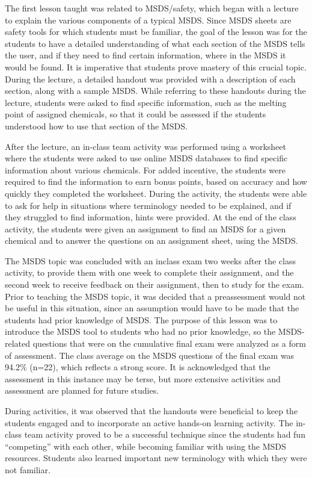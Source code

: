 \documentclass[11.5pt]{sig-alternate} %
\begin{document}
\begin{large}
The first lesson taught was related to MSDS/safety, which began with a lecture to explain the various components of a typical MSDS. Since MSDS sheets are safety tools for which students must be familiar, the goal of the lesson was for the students to have a detailed understanding of what each section of the MSDS tells the user, and if they need to find certain information, where in the MSDS it would be found. It is imperative that students prove mastery of this crucial topic. During the lecture, a detailed handout was provided with a description of each section, along with a sample MSDS. While referring to these handouts during the lecture, students were asked to find specific information, such as the melting point of assigned chemicals, so that it could be assessed if the students understood how to use that section of the MSDS.

After the lecture, an in-class team activity was performed using a worksheet where the students were asked to use online MSDS databases to find specific information about various chemicals. For added incentive, the students were required to find the information to earn bonus points, based on accuracy and how quickly they completed the worksheet. During the activity, the students were able to ask for help in situations where terminology needed to be explained, and if they struggled to find information, hints were provided. At the end of the class activity, the students were given an assignment to find an MSDS for a given chemical and to answer the questions on an assignment sheet, using the MSDS.

The MSDS topic was concluded with an inclass exam two weeks after the class activity, to provide them with one week to complete their assignment, and the second week to receive feedback on their assignment, then to study for the exam. Prior to teaching the MSDS topic, it was decided that a preassessment would not be useful in this situation, since an assumption would have to be made that the students had prior knowledge of MSDS. The purpose of this lesson was to introduce the MSDS tool to students who had no prior knowledge, so the MSDS-related questions that were on the cumulative final exam were analyzed as a form of assessment. The class average on the MSDS questions of the final exam was 94.2\% (n=22), which reflects a strong score. It is acknowledged that the assessment in this instance may be terse, but more extensive activities and assessment are planned for future studies. 

During activities, it was observed that the handouts were beneficial to keep the students engaged and to incorporate an active hands-on learning activity. The in-class team activity proved to be a successful technique since the students had fun “competing” with each other, while becoming familiar with using the MSDS resources. Students also learned important new terminology with which they were not familiar.


\end{large}
\end{document}
